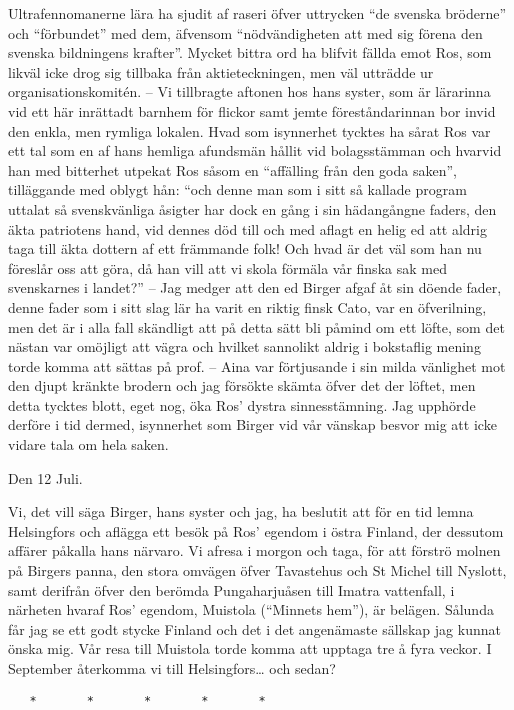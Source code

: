Ultrafennomanerne lära ha sjudit af raseri öfver uttrycken ``de svenska
bröderne'' och ``förbundet'' med dem, äfvensom ``nödvändigheten att med
sig förena den svenska bildningens krafter''. Mycket bittra ord ha
blifvit fällda emot Ros, som likväl icke drog sig tillbaka från
aktieteckningen, men väl utträdde ur organisationskomitén. -- Vi
tillbragte aftonen hos hans syster, som är lärarinna vid ett här
inrättadt barnhem för flickor samt jemte föreståndarinnan bor invid den
enkla, men rymliga lokalen. Hvad som isynnerhet tycktes ha sårat Ros var
ett tal som en af hans hemliga afundsmän hållit vid bolagsstämman och
hvarvid han med bitterhet utpekat Ros såsom en ``affälling från den goda
saken'', tilläggande med oblygt hån: ``och denne man som i sitt så
kallade program uttalat så svenskvänliga åsigter har dock en gång i sin
hädangångne faders, den äkta patriotens hand, vid dennes död till och
med aflagt en helig ed att aldrig taga till äkta dottern af ett
främmande folk! Och hvad är det väl som han nu föreslår oss att göra, då
han vill att vi skola förmäla vår finska sak med svenskarnes i landet?''
-- Jag medger att den ed Birger afgaf åt sin döende fader, denne fader
som i sitt slag lär ha varit en riktig finsk Cato, var en öfverilning,
men det är i alla fall skändligt att på detta sätt bli påmind om ett
löfte, som det nästan var omöjligt att vägra och hvilket sannolikt
aldrig i bokstaflig mening torde komma att sättas på prof. -- Aina var
förtjusande i sin milda vänlighet mot den djupt kränkte brodern och jag
försökte skämta öfver det der löftet, men detta tycktes blott, eget nog,
öka Ros' dystra sinnesstämning. Jag upphörde derföre i tid dermed,
isynnerhet som Birger vid vår vänskap besvor mig att icke vidare tala om
hela saken.

Den 12 Juli.

Vi, det vill säga Birger, hans syster och jag, ha beslutit att för en
tid lemna Helsingfors och aflägga ett besök på Ros' egendom i östra
Finland, der dessutom affärer påkalla hans närvaro. Vi afresa i morgon
och taga, för att förströ molnen på Birgers panna, den stora omvägen
öfver Tavastehus och St Michel till Nyslott, samt derifrån öfver den
berömda Pungaharjuåsen till Imatra vattenfall, i närheten hvaraf Ros'
egendom, Muistola (``Minnets hem''), är belägen. Sålunda får jag se ett
godt stycke Finland och det i det angenämaste sällskap jag kunnat önska
mig. Vår resa till Muistola torde komma att upptaga tre å fyra veckor. I
September återkomma vi till Helsingfors\ldots{} och sedan?

\begin{verbatim}
   *       *       *       *       *
\end{verbatim}

